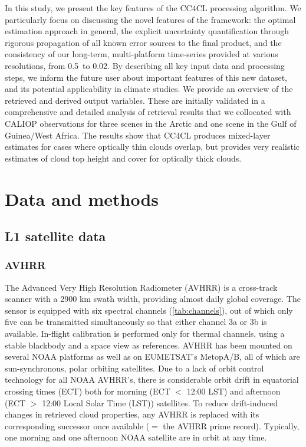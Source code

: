In this study, we present the key features of the CC4CL processing algorithm. We particularly focus on discussing the novel features of the framework: the optimal estimation approach in general, the explicit uncertainty quantification through rigorous propagation of all known error sources to the final product, and the consistency of our long-term, multi-platform time-series provided at various resolutions, from 0.5\textdegree\ to 0.02\textdegree. By describing all key input data and processing steps, we inform the future user about important features of this new dataset, and its potential applicability in climate studies. We provide an overview of the retrieved and derived output variables. These are initially validated in a comprehensive and detailed analysis of retrieval results that we collocated with CALIOP observations for three scenes in the Arctic and one scene in the Gulf of Guinea/West Africa. The results show that CC4CL produces mixed-layer estimates for cases where optically thin clouds overlap, but provides very realistic estimates of cloud top height and cover for optically thick clouds.

\section{Data and methods}\label{input_data}

\subsection{L1 satellite data}\label{sec:L1_data}

\subsubsection{AVHRR}

The Advanced Very High Resolution Radiometer (AVHRR) is a cross-track scanner with a 2900 km swath width, providing almost daily global coverage. The sensor is equipped with six spectral channels (\autoref{tab:channels}), out of which only five can be transmitted simultaneously so that either channel 3a or 3b is available. In-flight calibration is performed only for thermal channels, using a stable blackbody and a space view as references. AVHRR has been mounted on several NOAA platforms as well as on EUMETSAT's MetopA/B, all of which are sun-synchronous, polar orbiting satellites. Due to a lack of orbit control technology for all NOAA AVHRR's, there is considerable orbit drift in equatorial crossing times (ECT) both for morning (ECT $<$ 12:00 LST) and afternoon (ECT $>$ 12:00 Local Solar Time (LST)) satellites. To reduce drift-induced changes in retrieved cloud properties, any AVHRR is replaced with its corresponding successor once available ($=$ the AVHRR prime record). Typically, one morning and one afternoon NOAA satellite are in orbit at any time. 

